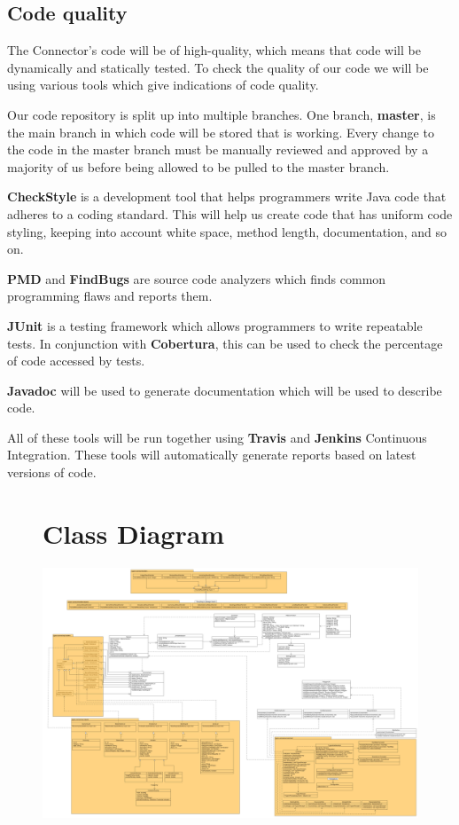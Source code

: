 \documentclass[a4paper]{article}
\begin{document}
\subsection{Code quality}
The Connector's code will be of high-quality, which means that code will be dynamically and statically tested. To check the quality of our code we will be using various tools which give indications of code quality. 

Our code repository is split up into multiple branches. One branch, \textbf{master}, is the main branch in which code will be stored that is working. Every change to the code in the master branch must be manually reviewed and approved by a majority of us before being allowed to be pulled to the master branch.

\textbf{CheckStyle} is a development tool that helps programmers write Java code that adheres to a coding standard. This will help us create code that has uniform code styling, keeping into account white space, method length, documentation, and so on.

\textbf{PMD} and \textbf{FindBugs} are source code analyzers which finds common programming flaws and reports them.

\textbf{JUnit} is a testing framework which allows programmers to write repeatable tests. In conjunction with \textbf{Cobertura}, this can be used to  check the percentage of code accessed by tests.

\textbf{Javadoc} will be used to generate documentation which will be used to describe code. %

All of these tools will be run together using \textbf{Travis} and \textbf{Jenkins} Continuous Integration. These tools will automatically generate reports based on latest versions of code.

\noindent
\begin{figure}
\section{Class Diagram}
\includegraphics[width=1.0\textwidth]{class diagram.png}
\end{figure}
\end{document}
